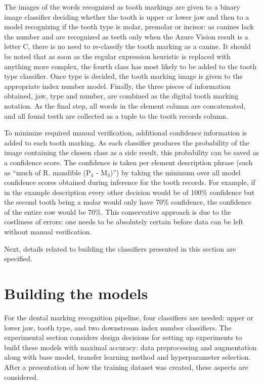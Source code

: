 \documentclass[english,twoside,openright]{UH_DS_MSc}
\begin{document}
The images of the words recognized as tooth markings are given to a binary image classifier deciding whether the tooth 
is upper or lower jaw and then to a model recognizing if the tooth type is molar, premolar or incisor: as 
canines lack the number and are recognized as teeth only when the Azure Vision result is a letter C, there is 
no need to re-classify the tooth marking as a canine. It should be noted that as soon as the regular expression
heuristic is replaced with anything more complex, the fourth class has most likely to be added to the tooth type classifier.
Once type is decided, the tooth marking image is given to the appropriate index number model. Finally, 
the three pieces of information obtained, jaw, type and number, are combined as the digital tooth marking 
notation. As the final step, all words in the element column are concatenated, and all found teeth are 
collected as a tuple to the tooth records column.

To minimize required manual verification, additional confidence information is added 
to each tooth marking. As each classifier produces the probability of the image containing the 
chosen class as a side result, this probability can be saved as a confidence score. The confidence is taken 
per element description phrase (such as ``much of R. mandible ($\text{P}_4$ - $\text{M}_3$)'') by taking the minimum over all 
model confidence scores obtained during inference for the tooth records. For example, if in the 
example description every other decision would be of 100\% confidence but the second tooth being a molar 
would only have 70\% confidence, the confidence of the entire row would be 70\%. This conservative approach is 
due to the costliness of errors: one needs to be absolutely certain before data can be left without manual 
verification.

Next, details related to building the classifiers presented in this section are specified.

\section{Building the models}
\label{sect:building-models}


For the dental marking recognition pipeline, four classifiers are needed: upper or lower jaw, 
tooth type, and two downstream index number classifiers. The experimental 
section considers design decisions for setting up experiments to build these models with maximal accuracy:
 data preprocessing and augmentation along with base model,
transfer learning method and hyperparameter selection. After a presentation of  how the training dataset was created, these aspects are considered.
\end{document}
